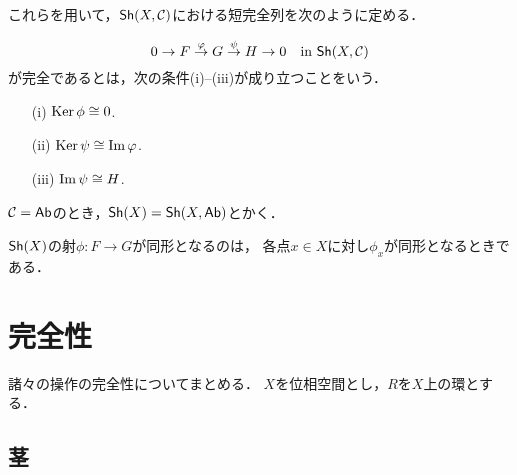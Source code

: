 これらを用いて，$\mathop{\textsf{Sh}}\nolimits(X,\mathcal{C})$における短完全列を次のように定める．
\begin{DFN}
    \begin{equation*}
        0\to F\overset{\varphi}{\to} 
        G\overset{\psi}{\to}H\to 0
        \quad\text{in $\mathop{\textsf{Sh}}\nolimits(X,\mathcal{C})$}
    \end{equation*}
    が完全であるとは，次の条件(i)--(iii)が成り立つことをいう．
    \begin{enumerate}
        \item [(i)]     $\mathop{\mathrm{Ker}}\nolimits\phi\cong0$.
        \item [(ii)]    $\mathop{\mathrm{Ker}}\nolimits\psi\cong\mathop{\mathrm{Im}}\nolimits\varphi$.
        \item [(iii)]   $\mathop{\mathrm{Im}}\nolimits\psi\cong H$.
    \end{enumerate}
\end{DFN}

$\mathcal{C}=\mathop{\textsf{Ab}}\nolimits$のとき，$\mathop{\textsf{Sh}}\nolimits(X)=\mathop{\textsf{Sh}}\nolimits(X,\mathop{\textsf{Ab}}\nolimits)$とかく．

\begin{PRP}[層の同形は茎ごとの同形]\label{prp:stalk-iso}
    $\mathop{\textsf{Sh}}\nolimits(X)$の射$\phi\colon F\to G$が同形となるのは，
    各点$x\in X$に対し$\phi_x$が同形となるときである．
\end{PRP}
















\section{完全性}
諸々の操作の完全性についてまとめる．
$X$を位相空間とし，$R$を$X$上の環とする．
\subsection{茎}

